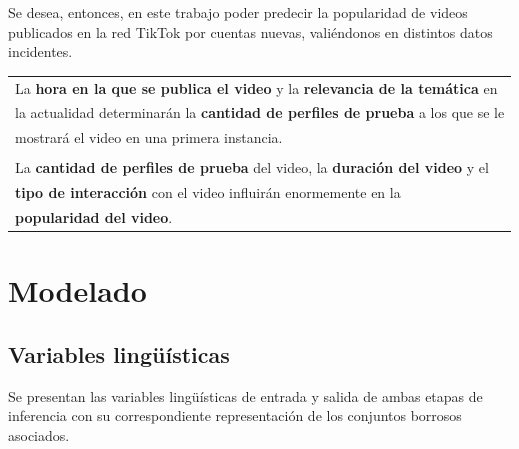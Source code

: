 \documentclass{article}
\begin{document}
Se desea, entonces, en este trabajo poder predecir la popularidad de videos publicados en la red TikTok 
por cuentas nuevas, valiéndonos en distintos datos incidentes. 


\begin{center}
	\begin{tabular}{|l}
	La \textbf{hora en la que se publica el video} y la \textbf{relevancia de la temática} en \\
	la actualidad determinarán la \textbf{cantidad de perfiles de prueba} a los que se le \\
	mostrará el video en una primera instancia.\\\\

	La \textbf{cantidad de perfiles de prueba} del video, la \textbf{duración del video} y el \\
	\textbf{tipo de interacción} con el video influirán enormemente en la \\ \textbf{popularidad del video}.
	\end{tabular}
\end{center}


\section{Modelado}

\subsection{Variables lingüísticas}

Se presentan las variables lingüísticas de entrada y salida de ambas etapas de inferencia con su correspondiente representación de los conjuntos borrosos asociados.
\end{document}
